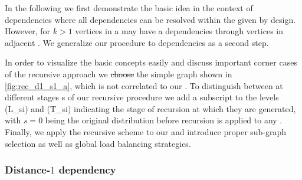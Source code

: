 In the following we first demonstrate the basic idea in the context of \DONE dependencies where all dependencies can be resolved within the given \levelGroup by design. However, for $k>1$ vertices in a \levelGroup may have a \DK dependencies through vertices in adjacent \levelGroups. We generalize our procedure to \DK dependencies as a second step.

In order to visualize the basic concepts easily and discuss important corner cases of the recursive approach we \sout{choose}  the simple graph shown in \cref{fig:rec_d1_s1_a}, which is not correlated to our \stex.  To distinguish between \levelGroups at different stages \acrshort{s} of our recursive procedure we add a subscript to the levels (\acrshort{L_si}) and \levelGroups (\acrshort{T_si}) indicating the stage of recursion at which they are generated, with $s=0$ being the original distribution before recursion is applied to any \subgraph. Finally, we apply the recursive scheme to our \stex and introduce proper sub-graph selection as well as global load balancing strategies. 

	
	\subsubsection{Distance-$1$ dependency}

